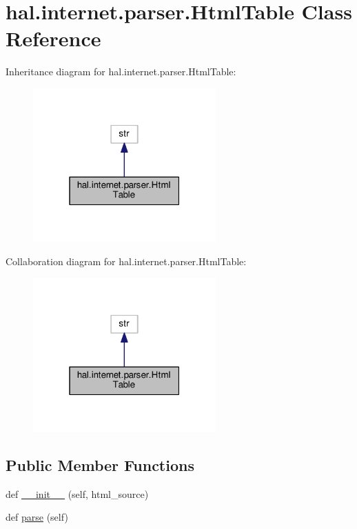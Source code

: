 \hypertarget{classhal_1_1internet_1_1parser_1_1_html_table}{}\section{hal.\+internet.\+parser.\+Html\+Table Class Reference}
\label{classhal_1_1internet_1_1parser_1_1_html_table}


Inheritance diagram for hal.\+internet.\+parser.\+Html\+Table\+:\nopagebreak
\begin{figure}[H]
\begin{center}
\leavevmode
\includegraphics[width=199pt]{classhal_1_1internet_1_1parser_1_1_html_table__inherit__graph}
\end{center}
\end{figure}


Collaboration diagram for hal.\+internet.\+parser.\+Html\+Table\+:\nopagebreak
\begin{figure}[H]
\begin{center}
\leavevmode
\includegraphics[width=199pt]{classhal_1_1internet_1_1parser_1_1_html_table__coll__graph}
\end{center}
\end{figure}
\subsection*{Public Member Functions}
\begin{DoxyCompactItemize}
\item 
def \hyperlink{classhal_1_1internet_1_1parser_1_1_html_table_a5bcf5b773113fd62eb6b5319372c5e6b}{\+\_\+\+\_\+init\+\_\+\+\_\+} (self, html\+\_\+source)
\item 
def \hyperlink{classhal_1_1internet_1_1parser_1_1_html_table_addcc7238344dce5f6f71426ae03ce362}{parse} (self)
\end{DoxyCompactItemize}
